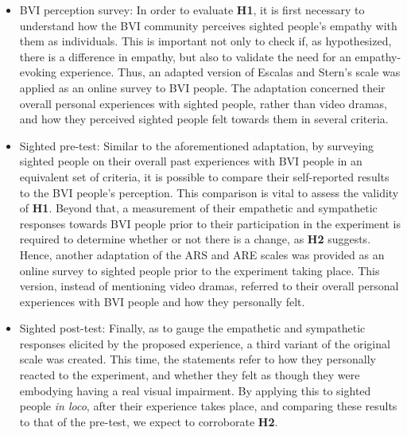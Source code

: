 \documentclass{vgtc}                          %
\begin{document}
\begin{itemize}
        \item BVI perception survey: In order to evaluate \textbf{H1}, it is first necessary to understand how the BVI community perceives sighted people's empathy with them as individuals. This is important not only
        to check if, as hypothesized, there is a difference in empathy, but also to validate the need for an empathy-evoking experience. Thus, an adapted version of Escalas and Stern's scale \cite{Escalas:2003} was applied as an online survey to BVI people. The adaptation concerned their overall personal experiences with sighted people, rather than video dramas, and how they perceived sighted people felt towards them in several criteria. 

    \item Sighted pre-test: Similar to the aforementioned adaptation, by surveying sighted people on their overall past experiences with BVI people in an equivalent set of criteria, it is possible to compare their self-reported results to the BVI people’s perception. This comparison is vital to assess the validity of \textbf{H1}. Beyond that, a measurement of their empathetic and sympathetic responses towards BVI people prior to their participation in the experiment is required to determine whether or not there is a change, as \textbf{H2} suggests. Hence, another adaptation of the ARS and ARE scales \cite{Escalas:2003} was provided as an online survey to sighted people prior to the experiment taking place. This version, instead of mentioning video dramas, referred to their overall personal experiences with BVI people and how they personally felt. 
    \item Sighted post-test: Finally, as to gauge the empathetic and sympathetic responses elicited by the proposed experience, a third variant of the original scale \cite{Escalas:2003} was created. This time, the statements refer to how they personally reacted to the experiment, and whether they felt as though they were embodying having a real visual impairment. By applying this to sighted people \textit{in loco}, after their experience takes place, and comparing these results to that of the pre-test, we expect to corroborate \textbf{H2}.
\end{itemize}

\end{document}
